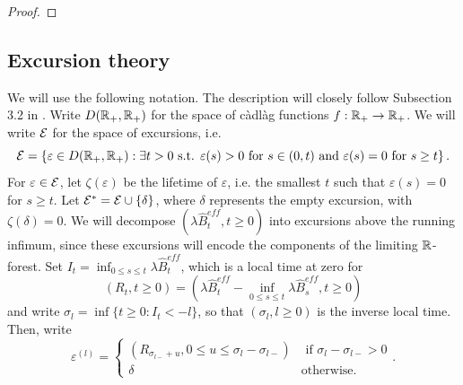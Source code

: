 \begin{proof}
\end{proof}
\subsection{Excursion theory}\label{subsec.excursiontheory}

We will use the following notation. The description will closely follow Subsection 3.2 in \cite{Conchon2018}. Write $D({\mathbb R}_+,{\mathbb R}_+)$ for the space of c\`adl\`ag functions $f:{\mathbb R}_+\to {\mathbb R}_+$. We will write ${\mathcal E}$ for the space of excursions, i.e.
$${\mathcal E}=\left\{\varepsilon \in D({\mathbb R}_+,{\mathbb R}_+):\exists t>0\text{ s.t. }\varepsilon(s)>0\text{ for }s\in (0,t)\text{ and }\varepsilon(s)=0\text{ for }s\geq t\right\}.$$
For $\varepsilon\in {\mathcal E}$, let $\zeta(\varepsilon)$ be the lifetime of $\varepsilon$, i.e. the smallest $t$ such that $\varepsilon(s)=0$ for $s\geq t$. Let ${\mathcal E}^*={\mathcal E}\cup\{\delta\}$, where $\delta$ represents the empty excursion, with $\zeta(\delta)=0$. We will decompose $(\lambda \hat{B}^{eff}_t,t\geq 0)$ into excursions above the running infimum, since these excursions will encode the components of the limiting ${\mathbb R}$-forest. Set $I_t=\inf_{0\leq s\leq t}\lambda \hat{B}_t^{eff}$, which is a local time at zero for 
$$(R_t,t\geq 0)=\left(\lambda \hat{B}_t^{eff}-\inf_{0\leq s \leq t}\lambda \hat{B}_s^{eff},t\geq 0\right)$$  and write $\sigma _l=\inf\{t\geq 0: I_t<-l\}$, so that $(\sigma_l, l\geq 0)$ is the inverse local time. Then, write 
$$\varepsilon^{(l)}=\begin{cases}(R_{\sigma_{l-}+u}, 0\leq u \leq \sigma_l-\sigma_{l-})&\text{ if }\sigma_l-\sigma_{l-}>0\\ \delta &\text{otherwise.}\end{cases}.$$

